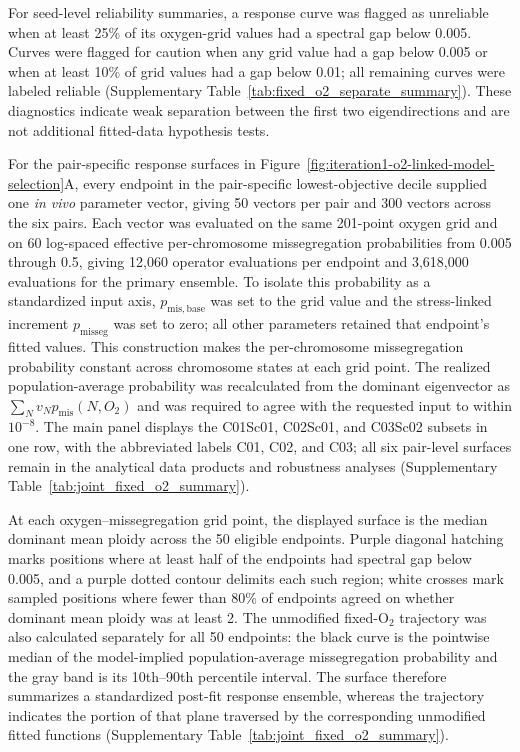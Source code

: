 \documentclass[11pt]{article}
\begin{document}
For seed-level reliability summaries, a response curve was flagged as unreliable when at least 25\% of its oxygen-grid values had a spectral gap below 0.005. Curves were flagged for caution when any grid value had a gap below 0.005 or when at least 10\% of grid values had a gap below 0.01; all remaining curves were labeled reliable (Supplementary Table~\ref{tab:fixed_o2_separate_summary}). These diagnostics indicate weak separation between the first two eigendirections and are not additional fitted-data hypothesis tests.

For the pair-specific response surfaces in Figure~\ref{fig:iteration1-o2-linked-model-selection}A, every endpoint in the pair-specific lowest-objective decile supplied one \textit{in vivo} parameter vector, giving 50 vectors per pair and 300 vectors across the six pairs. Each vector was evaluated on the same 201-point oxygen grid and on 60 log-spaced effective per-chromosome missegregation probabilities from 0.005 through 0.5, giving 12,060 operator evaluations per endpoint and 3,618,000 evaluations for the primary ensemble. To isolate this probability as a standardized input axis, \(p_{\mathrm{mis,base}}\) was set to the grid value and the stress-linked increment \(p_{\mathrm{misseg}}\) was set to zero; all other parameters retained that endpoint's fitted values. This construction makes the per-chromosome missegregation probability constant across chromosome states at each grid point. The realized population-average probability was recalculated from the dominant eigenvector as \(\sum_Nv_Np_{\mathrm{mis}}(N,O_2)\) and was required to agree with the requested input to within \(10^{-8}\). The main panel displays the C01Sc01, C02Sc01, and C03Sc02 subsets in one row, with the abbreviated labels C01, C02, and C03; all six pair-level surfaces remain in the analytical data products and robustness analyses (Supplementary Table~\ref{tab:joint_fixed_o2_summary}).

At each oxygen--missegregation grid point, the displayed surface is the median dominant mean ploidy across the 50 eligible endpoints. Purple diagonal hatching marks positions where at least half of the endpoints had spectral gap below 0.005, and a purple dotted contour delimits each such region; white crosses mark sampled positions where fewer than 80\% of endpoints agreed on whether dominant mean ploidy was at least 2. The unmodified fixed-O$_2$ trajectory was also calculated separately for all 50 endpoints: the black curve is the pointwise median of the model-implied population-average missegregation probability and the gray band is its 10th--90th percentile interval. The surface therefore summarizes a standardized post-fit response ensemble, whereas the trajectory indicates the portion of that plane traversed by the corresponding unmodified fitted functions (Supplementary Table~\ref{tab:joint_fixed_o2_summary}).
\end{document}
